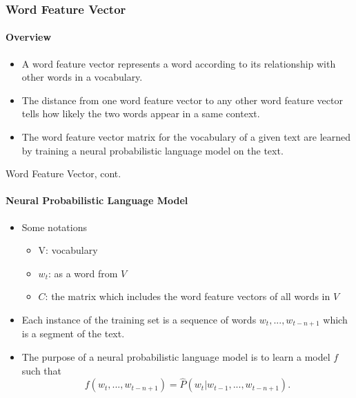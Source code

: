 \documentclass{beamer}
\begin{document}
\begin{frame} \frametitle{Word Feature Vector}\framesubtitle{Overview}
  \begin{itemize}
      \item A word feature vector represents a word according to its relationship with other words in a vocabulary.
      \item The distance from one word feature vector to any other word feature vector tells how likely the two words appear in a same context.
      \item The word feature vector matrix for the vocabulary of a given text are learned by training a neural probabilistic language model on the text.
  \end{itemize}
\end{frame}

\begin{frame}{Word Feature Vector, cont.}\framesubtitle{Neural Probabilistic Language Model}

    \begin{itemize}
        \item Some notations
            \begin{itemize}
                \item V: vocabulary
                \item $w_t$: as a word from $V$
                \item $C$: the matrix which includes the word feature vectors of all words in $V$
            \end{itemize}
        \item Each instance of the training set is a sequence of words $w_t, ..., w_{t-n+1}$ which is a segment of the text.
        \item The purpose of a neural probabilistic language model is to learn a model $f$ such that
        $$ f(w_t, ..., w_{t-n+1}) = \hat{P}(w_t | w_{t-1},...,w_{t-n+1}).$$
    \end{itemize}
\end{frame}
\end{document}
